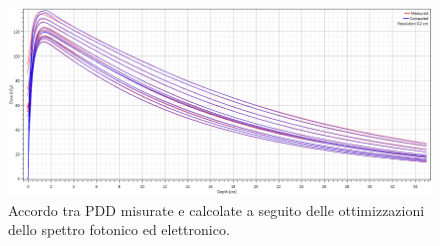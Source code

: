 \begin{figure}
\centering
\includegraphics[width=\textwidth]{./cap2/Ray_PDD_meas_calc.png}
\caption{Accordo tra PDD misurate e calcolate a seguito delle ottimizzazioni dello spettro fotonico ed elettronico.}
\label{fig:Ray_PDD_meas_calc}
\end{figure}



